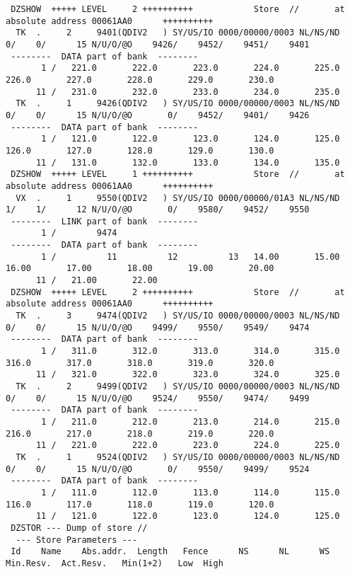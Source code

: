 \begin{Listing}
\begin{verbatim}
 DZSHOW  +++++ LEVEL     2 ++++++++++            Store  //       at absolute address 00061AA0      ++++++++++
  TK  .     2     9401(QDIV2   ) SY/US/IO 0000/00000/0003 NL/NS/ND    0/    0/      15 N/U/O/@O    9426/    9452/    9451/    9401
 --------  DATA part of bank  --------
       1 /   221.0       222.0       223.0       224.0       225.0       226.0       227.0       228.0       229.0       230.0
      11 /   231.0       232.0       233.0       234.0       235.0
  TK  .     1     9426(QDIV2   ) SY/US/IO 0000/00000/0003 NL/NS/ND    0/    0/      15 N/U/O/@O       0/    9452/    9401/    9426
 --------  DATA part of bank  --------
       1 /   121.0       122.0       123.0       124.0       125.0       126.0       127.0       128.0       129.0       130.0
      11 /   131.0       132.0       133.0       134.0       135.0
 DZSHOW  +++++ LEVEL     1 ++++++++++            Store  //       at absolute address 00061AA0      ++++++++++
  VX  .     1     9550(QDIV2   ) SY/US/IO 0000/00000/01A3 NL/NS/ND    1/    1/      12 N/U/O/@O       0/    9580/    9452/    9550
 --------  LINK part of bank  --------
       1 /        9474
 --------  DATA part of bank  --------
       1 /          11          12          13   14.00       15.00       16.00       17.00       18.00       19.00       20.00
      11 /   21.00       22.00
 DZSHOW  +++++ LEVEL     2 ++++++++++            Store  //       at absolute address 00061AA0      ++++++++++
  TK  .     3     9474(QDIV2   ) SY/US/IO 0000/00000/0003 NL/NS/ND    0/    0/      15 N/U/O/@O    9499/    9550/    9549/    9474
 --------  DATA part of bank  --------
       1 /   311.0       312.0       313.0       314.0       315.0       316.0       317.0       318.0       319.0       320.0
      11 /   321.0       322.0       323.0       324.0       325.0
  TK  .     2     9499(QDIV2   ) SY/US/IO 0000/00000/0003 NL/NS/ND    0/    0/      15 N/U/O/@O    9524/    9550/    9474/    9499
 --------  DATA part of bank  --------
       1 /   211.0       212.0       213.0       214.0       215.0       216.0       217.0       218.0       219.0       220.0
      11 /   221.0       222.0       223.0       224.0       225.0
  TK  .     1     9524(QDIV2   ) SY/US/IO 0000/00000/0003 NL/NS/ND    0/    0/      15 N/U/O/@O       0/    9550/    9499/    9524
 --------  DATA part of bank  --------
       1 /   111.0       112.0       113.0       114.0       115.0       116.0       117.0       118.0       119.0       120.0
      11 /   121.0       122.0       123.0       124.0       125.0
 DZSTOR --- Dump of store //
  --- Store Parameters ---
 Id    Name    Abs.addr.  Length   Fence      NS      NL      WS  Min.Resv.  Act.Resv.   Min(1+2)   Low  High

\end{verbatim}
\end{Listing}
